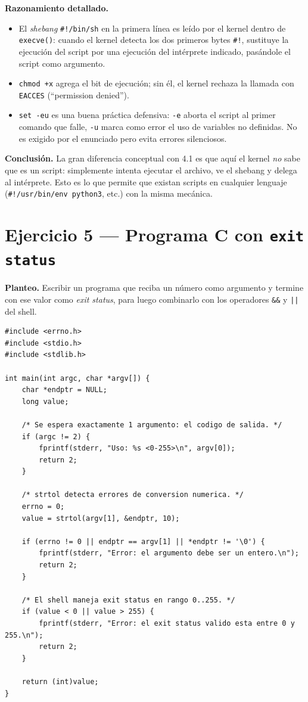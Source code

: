 \documentclass[11pt,a4paper]{article}
\begin{document}
\textbf{Razonamiento detallado.}
\begin{itemize}[leftmargin=*]
    \item El \emph{shebang} \texttt{\#!/bin/sh} en la primera línea es
        leído por el kernel dentro de \texttt{execve()}: cuando el
        kernel detecta los dos primeros bytes \texttt{\#!}, sustituye
        la ejecución del script por una ejecución del intérprete
        indicado, pasándole el script como argumento.
    \item \texttt{chmod +x} agrega el bit de ejecución; sin él, el
        kernel rechaza la llamada con \texttt{EACCES} (``permission
        denied'').
    \item \texttt{set -eu} es una buena práctica defensiva: \texttt{-e}
        aborta el script al primer comando que falle, \texttt{-u}
        marca como error el uso de variables no definidas. No es
        exigido por el enunciado pero evita errores silenciosos.
\end{itemize}

\textbf{Conclusión.} La gran diferencia conceptual con 4.1 es que aquí
el kernel \emph{no} sabe que es un script: simplemente intenta
ejecutar el archivo, ve el shebang y delega al intérprete. Esto es lo
que permite que existan scripts en cualquier lenguaje
(\texttt{\#!/usr/bin/env python3}, etc.) con la misma mecánica.

\section{Ejercicio 5 --- Programa C con \texttt{exit status}}

\textbf{Planteo.} Escribir un programa que reciba un número como
argumento y termine con ese valor como \emph{exit status}, para luego
combinarlo con los operadores \texttt{\&\&} y \texttt{||} del shell.

\begin{lstlisting}[style=cstyle]
#include <errno.h>
#include <stdio.h>
#include <stdlib.h>

int main(int argc, char *argv[]) {
    char *endptr = NULL;
    long value;

    /* Se espera exactamente 1 argumento: el codigo de salida. */
    if (argc != 2) {
        fprintf(stderr, "Uso: %s <0-255>\n", argv[0]);
        return 2;
    }

    /* strtol detecta errores de conversion numerica. */
    errno = 0;
    value = strtol(argv[1], &endptr, 10);

    if (errno != 0 || endptr == argv[1] || *endptr != '\0') {
        fprintf(stderr, "Error: el argumento debe ser un entero.\n");
        return 2;
    }

    /* El shell maneja exit status en rango 0..255. */
    if (value < 0 || value > 255) {
        fprintf(stderr, "Error: el exit status valido esta entre 0 y 255.\n");
        return 2;
    }

    return (int)value;
}
\end{lstlisting}
\end{document}
